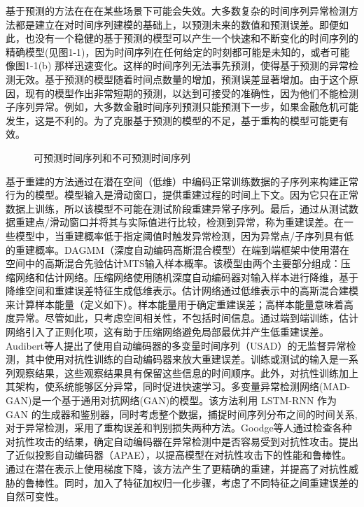 基于预测的方法在在在某些场景下可能会失效。大多数复杂的时间序列异常检测方法都是建立在对时间序列建模的基础上，以预测未来的数值和预测误差。即便如此，也没有一个稳健的基于预测的模型可以产生一个快速和不断变化的时间序列的精确模型(见图1-1)，因为时间序列在任何给定的时刻都可能是未知的，或者可能像图1-1(b) 那样迅速变化。这样的时间序列无法事先预测，使得基于预测的异常检测无效。基于预测的模型随着时间点数量的增加，预测误差显著增加。由于这个原因，现有的模型作出非常短期的预测，以达到可接受的准确性，因为他们不能检测子序列异常。例如，大多数金融时间序列预测只能预测下一步，如果金融危机可能发生，这是不利的。为了克服基于预测的模型的不足，基于重构的模型可能更有效。

\begin{figure}[htbp]
    \centering
    \centering
    \caption{可预测时间序列和不可预测时间序列\cite{none1}}
    \end{figure}

基于重建的方法通过在潜在空间（低维）中编码正常训练数据的子序列来构建正常行为的模型。模型输入是滑动窗口，提供重建过程的时间上下文。因为它只在正常数据上训练，所以该模型不可能在测试阶段重建异常子序列。最后，通过从测试数据重建点/滑动窗口并将其与实际值进行比较，检测到异常，称为重建误差。在一些模型中，当重建概率低于指定阈值时触发异常检测，因为异常点/子序列具有低的重建概率。DAGMM（深度自动编码高斯混合模型）\cite{dagmm}在端到端框架中使用潜在空间中的高斯混合先验估计MTS输入样本概率。该模型由两个主要部分组成：压缩网络和估计网络。压缩网络使用随机深度自动编码器对输入样本进行降维，基于降维空间和重建误差特征生成低维表示。估计网络通过低维表示中的高斯混合建模来计算样本能量（定义如下）。样本能量用于确定重建误差；高样本能量意味着高度异常。尽管如此，只考虑空间相关性，不包括时间信息。通过端到端训练，估计网络引入了正则化项，这有助于压缩网络避免局部最优并产生低重建误差。Audibert等人\cite{usad}提出了使用自动编码器的多变量时间序列（USAD）的无监督异常检测，其中使用对抗性训练的自动编码器来放大重建误差。训练或测试的输入是一系列观察结果，这些观察结果具有保留这些信息的时间顺序。此外，对抗性训练加上其架构，使系统能够区分异常，同时促进快速学习。多变量异常检测网络(MAD-GAN)\cite{mtad-gat}是一个基于通用对抗网络(GAN)的模型。该方法利用 LSTM-RNN 作为 GAN 的生成器和鉴别器，同时考虑整个数据，捕捉时间序列分布之间的时间关系, 对于异常检测，采用了重构误差和判别损失两种方法。Goodge等人\cite{apae}通过检查各种对抗性攻击的结果，确定自动编码器在异常检测中是否容易受到对抗性攻击。提出了近似投影自动编码器（APAE），以提高模型在对抗性攻击下的性能和鲁棒性。通过在潜在表示上使用梯度下降，该方法产生了更精确的重建，并提高了对抗性威胁的鲁棒性。同时，加入了特征加权归一化步骤，考虑了不同特征之间重建误差的自然可变性。

